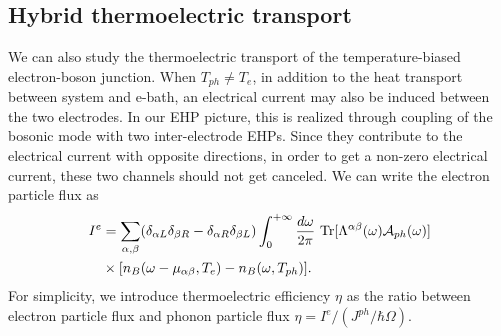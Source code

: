 \documentclass[aps,prb,
,floatfix,footinbib,shortbibliography,
preprint
]{revtex4-1}
\begin{document}



\subsection{Hybrid thermoelectric transport}
 We can also study the thermoelectric transport of the temperature-biased electron-boson junction. When $T_{ph}\neq T_e$, in addition to the heat transport between system and e-bath, an electrical current may also be induced between the two electrodes\cite{entinwuhlman2010three,sanchez2011optimal}. In our EHP picture, this is realized through coupling of the bosonic mode with two inter-electrode EHPs. Since they contribute to the electrical current with opposite directions, in order to get a non-zero electrical current, these two channels should not get canceled. We can write the electron particle flux as
 \begin{align}
 I^e &= \sum_{\alpha,\beta} (\delta_{\alpha L}\delta_{\beta R} - \delta_{\alpha R}\delta_{\beta L})   \int_0^{+\infty}\frac{d\omega}{2\pi}\ {\rm Tr}[\Lambda^{\alpha\beta}(\omega)\mathcal{A}_{ph}(\omega)]\nonumber\\
 &\times [n_B(\omega-\mu_{\alpha\beta},{T}_{e})-n_B(\omega,T_{ph})].
 \label{eq:ietrans}
 \end{align}
 For simplicity, we introduce thermoelectric efficiency $\eta$ as the ratio between electron particle flux and phonon particle flux $\eta= I^e / (J^{ph}/\hbar\Omega)$.
\end{document}
